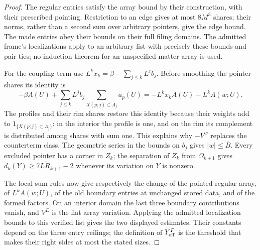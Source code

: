 \documentclass[11pt,letterpaper,reqno]{amsart}
\theoremstyle{definition}
\theoremstyle{remark}
\begin{document}
\begin{proof}
The regular entries satisfy the array bound by their
construction, with their prescribed pointing. Restriction
to an edge gives at most $8M^3$ shares; their norms, rather
than a second sum over arbitrary pointers, give the edge
bound. The made entries obey their bounds on their full
filing domains. The admitted frame's localizations apply
to an arbitrary list with precisely these bounds and pair
ties; no induction theorem for an unspecified matter
array is used.

For the coupling term use
$L^kx_k=\beta-\sum_{j\le k}L^jb_j$. Before smoothing the
pointer shares its identity is
\[
 -\beta A(U)+\sum_{j\le k}L^jb_j
       \sum_{X(p;j)\subset\Lambda_j}a_p(U)
       =-L^kx_kA(U)-L^kA(w;U).
\]
The profiles and their rim shares restore this identity
because their weights add to
$1_{\{X(p;j)\subset\Lambda_j\}}$: in the interior the
profile is one, and on the rim its complement is
distributed among shares with sum one. This explains why
$-V^w$ replaces the counterterm class. The geometric
series in the bounds on $b_j$ gives $|w|\le\bar B$.
Every excluded pointer has a corner in $Z_k$; the
separation of $Z_k$ from $\Omega_{k+1}$ gives
$d_k(Y)\ge7L\check R_{k+1}-2$ whenever its variation
on $Y$ is nonzero.

The local sum rules now give respectively the change of
the pointed regular array, of $L^kA(w;U)$, of the old
boundary entries at unchanged stored data, and of the
formed factors. On an interior domain the last three
boundary contributions vanish, and $V^E$ is the flat
array variation. Applying the admitted localization
bounds to this verified list gives the two displayed
estimates. Their constants depend on the three entry
ceilings; the definition of $Y_{\rm eff}^F$ is the
threshold that makes their right sides at most the
stated sizes.
\end{proof}
\end{document}
